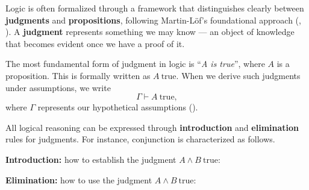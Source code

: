 Logic is often formalized through a framework that distinguishes clearly between
\textbf{judgments} and \textbf{propositions}, following Martin-Löf's foundational approach
(\cite{martin-lof-1983}, \cite{plato:intuitionistic-type-theory}).
A \textbf{judgment} represents something we may know — an object of knowledge that becomes
evident once we have a proof of it.

The most fundamental form of judgment in logic is ``\textit{A is true}'', where \( A \) is a
proposition. This is formally written as \( A\ \text{true} \).  
When we derive such judgments under assumptions, we write
\[
\Gamma \vdash A\ \text{true},
\]
where \( \Gamma \) represents our hypothetical assumptions
(\cite{pfenning-natded}).

\begin{example}
All logical reasoning can be expressed through \textbf{introduction} and
\textbf{elimination} rules for judgments.
For instance, conjunction is characterized as follows.

\textbf{Introduction:} how to establish the judgment \( A \land B\ \text{true} \):

\begin{prooftree}
\end{prooftree}

\textbf{Elimination:} how to use the judgment \( A \land B\ \text{true} \):

\begin{minipage}[t]{0.45\textwidth}
\begin{prooftree}
\end{prooftree}
\end{minipage}\hfill
\begin{minipage}[t]{0.45\textwidth}
\begin{prooftree}
\end{prooftree}
\end{minipage}
\end{example}

